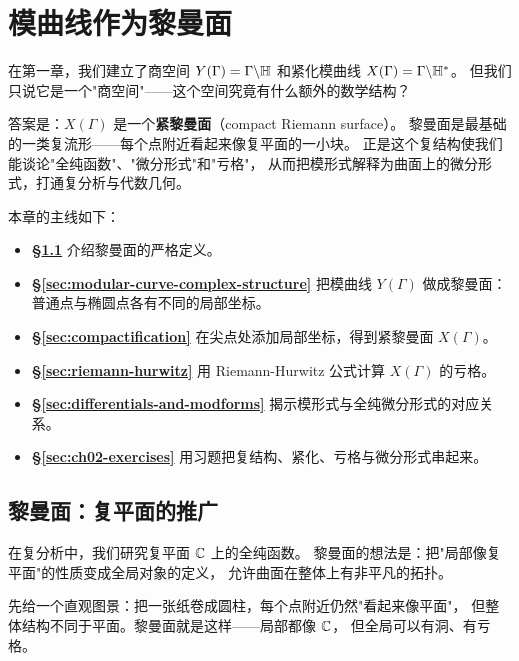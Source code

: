 \chapter{模曲线作为黎曼面}
\label{ch:riemann-surfaces}

在第一章，我们建立了商空间
$Y(\Gamma) = \Gamma \backslash \mathbb{H}$ 和紧化模曲线
$X(\Gamma) = \Gamma \backslash \mathbb{H}^*$。
但我们只说它是一个"商空间"——这个空间究竟有什么额外的数学结构？

答案是：$X(\Gamma)$ 是一个\textbf{紧黎曼面}（compact Riemann surface）。
黎曼面是最基础的一类复流形——每个点附近看起来像复平面的一小块。
正是这个复结构使我们能谈论"全纯函数"、"微分形式"和"亏格"，
从而把模形式解释为曲面上的微分形式，打通复分析与代数几何。

本章的主线如下：
\begin{itemize}
  \item \textbf{§\ref{sec:riemann-surface-def}} 介绍黎曼面的严格定义。
  \item \textbf{§\ref{sec:modular-curve-complex-structure}}
    把模曲线 $Y(\Gamma)$ 做成黎曼面：普通点与椭圆点各有不同的局部坐标。
  \item \textbf{§\ref{sec:compactification}}
    在尖点处添加局部坐标，得到紧黎曼面 $X(\Gamma)$。
  \item \textbf{§\ref{sec:riemann-hurwitz}}
    用 Riemann-Hurwitz 公式计算 $X(\Gamma)$ 的亏格。
  \item \textbf{§\ref{sec:differentials-and-modforms}}
    揭示模形式与全纯微分形式的对应关系。
  \item \textbf{§\ref{sec:ch02-exercises}}
    用习题把复结构、紧化、亏格与微分形式串起来。
\end{itemize}


\section{黎曼面：复平面的推广}
\label{sec:riemann-surface-def}

在复分析中，我们研究复平面 $\mathbb{C}$ 上的全纯函数。
黎曼面的想法是：把"局部像复平面"的性质变成全局对象的定义，
允许曲面在整体上有非平凡的拓扑。

先给一个直观图景：把一张纸卷成圆柱，每个点附近仍然"看起来像平面"，
但整体结构不同于平面。黎曼面就是这样——局部都像 $\mathbb{C}$，
但全局可以有洞、有亏格。


